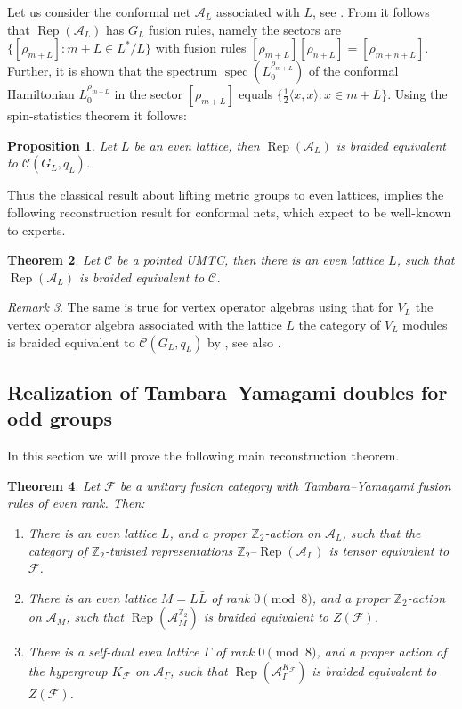 \documentclass[twoside,11pt,reqno]{amsart}
\newtheorem{thm}{Theorem}[section]
\newtheorem{prop}[thm]{Proposition}
\theoremstyle{definition}
\theoremstyle{remark}
\newtheorem{rmk}[thm]{Remark}
\newcommand{\cF}{\mathcal{F}}
\newcommand{\cC}{\mathcal{C}}
\newcommand{\A}{\mathcal{A}}
\newcommand{\ZZ}{\mathbb{Z}}
\DeclareMathOperator{\Rep}{Rep}
\DeclareMathOperator*{\spec}{spec}
\newcommand{\tRep}[1]{#1\text{--}\Rep}
\begin{document}
Let us consider the conformal net $\A_L$ associated with $L$, see 
\cite{DoXu2006,Bi2012}.
From \cite{DoXu2006} it follows that $\Rep(\A_L)$ has $G_L$ fusion rules, 
namely the sectors are $\{[\rho_{m+L}]:m+L\in L^\ast/L\}$ with fusion rules
$[\rho_{m+L}][\rho_{n+L}]=[\rho_{m+n+L}]$.
Further, it is shown that the spectrum $\spec(L^{\rho_{m+L}}_0)$ of the 
conformal Hamiltonian $L^{\rho_{m+L}}_0$ in the sector $[\rho_{m+L}]$ equals
$\{\frac12\langle x,x\rangle : x\in m+L\}$.
Using the spin-statistics theorem \cite{GuLo1996} it follows:
\begin{prop}
  \label{prop:LatticeConformalNetsUMTC}
  Let $L$ be an even lattice, then $\Rep(\A_L)$ is braided equivalent to 
  $\cC(G_L,q_L)$.
\end{prop} 
Thus the classical result \cite{Ni1979} about lifting metric groups to even 
lattices, implies the following reconstruction result for conformal nets,
which expect to be well-known to experts.
%
\begin{thm}
  \label{thm:AllPointed}
  Let $\cC$ be a pointed UMTC, then there is an even lattice $L$, such that 
  $\Rep(\A_L)$ is braided equivalent to $\cC$.
\end{thm}
\begin{rmk} The same is true for vertex operator algebras using that for $V_L$ 
  the vertex operator algebra associated with the lattice $L$ the category of 
  $V_L$ modules is braided equivalent to $\cC(G_L,q_L)$ by \cite{DoLe1994}, 
  see also \cite{Hh2000}.
\end{rmk}

\subsection{Realization of Tambara--Yamagami doubles for odd groups}
In this section we will prove the following main reconstruction theorem.
\begin{thm} 
  \label{thm:AllOddTYs}
  Let $\cF$ be a unitary fusion category with Tambara--Yamagami fusion rules of
  even rank. 
  Then:
  \begin{enumerate}
    \item There is an even lattice $L$, and a proper $\ZZ_2$-action on $\A_L$, 
      such that the category of $\ZZ_2$-twisted representations 
      $\tRep{\ZZ_2}(\A_L)$ is tensor equivalent to $\cF$.
    \item\label{it:Double} There is an even lattice $M=L\bar L$ of rank 
      $0\pmod 8$, and a proper $\ZZ_2$-action on $\A_M$, such that 
      $\Rep(\A_M^{\ZZ_2})$ is braided equivalent to $Z(\cF)$.
    \item There is a self-dual even lattice $\Gamma$ of rank $0\pmod 8$, and a 
      proper action of the hypergroup $K_\cF$ on $\A_\Gamma$, such that 
      $\Rep(\A_\Gamma^{K_\cF})$ is braided equivalent to $Z(\cF)$.
  \end{enumerate}
\end{thm}
\end{document}
